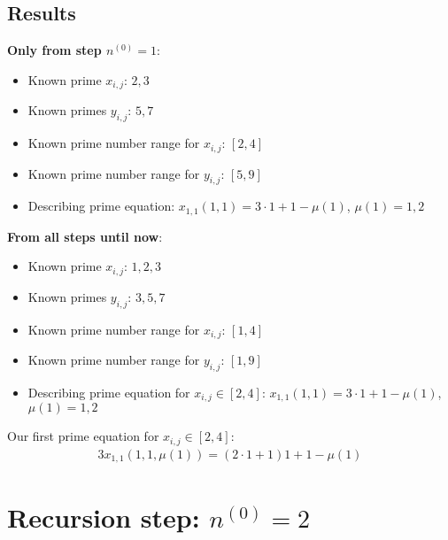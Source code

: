 \subsection{Results}
\label{ss:resultsstepn0_1}
\textbf{Only from step $n^{\left(0\right)} = 1$}:
\begin{itemize}
	\item Known prime $x_{i,j}$: $2,3$
	\item Known primes $y_{i,j}$: $5,7$
	\item Known prime number range for $x_{i,j}$: $[2,4]$
	\item Known prime number range for $y_{i,j}$: $[5,9]$
	\item Describing prime equation: $x_{1,1}\left(1,1\right) = 3\cdot 1 + 1 - \mu\left(1\right)$, $\mu\left(1\right) = 1,2$
\end{itemize}

\textbf{From all steps until now}:
\begin{itemize}
	\item Known prime $x_{i,j}$: $1,2,3$
	\item Known primes $y_{i,j}$: $3,5,7$
	\item Known prime number range for $x_{i,j}$: $[1,4]$
	\item Known prime number range for $y_{i,j}$: $[1,9]$
	\item Describing prime equation for $x_{i,j} \in [2,4]$: $x_{1,1}\left(1,1\right) = 3\cdot 1 + 1 - \mu\left(1\right)$, $\mu\left(1\right) = 1,2$
\end{itemize}

Our first prime equation for $x_{i,j} \in [2,4]$:
\begin{alignat}{3}
	x_{1,1}\left(1,1,\mu\left(1\right)\right) = \left(2 \cdot 1 + 1\right)1 + 1 - \mu\left(1\right) \label{eq:resultstepn0_1}
\end{alignat}
\section{Recursion step: $n^{\left(0\right)} = 2$}
\label{s:recursionstepn0_2}
